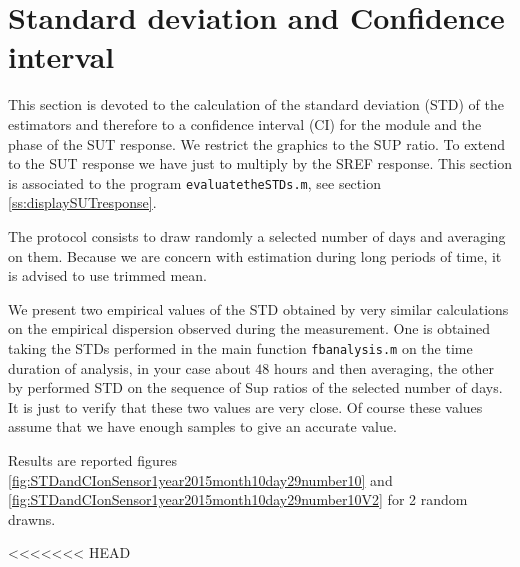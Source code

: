 \newpage\clearpage
\section{Standard deviation and Confidence interval}
This section is devoted to the calculation of the standard deviation (STD) of the estimators and therefore to a confidence interval (CI) for the module and the phase of the SUT response. We restrict the graphics to the SUP ratio. To extend to the SUT response we have just to multiply by the SREF response. This section is associated to the program {\tt evaluatetheSTDs.m}, see section
\ref{ss:displaySUTresponse}.

The protocol consists to draw randomly a selected number of days and averaging on them. Because we are concern with estimation during long periods of time, it is advised to use trimmed mean.

We present  two empirical values of the STD obtained by very similar calculations on the empirical dispersion observed during the measurement. One is obtained taking the STDs performed in the main function {\tt fbanalysis.m} on the time duration of analysis, in your case about $48$ hours and then averaging, the other by performed STD on the sequence of Sup ratios of the selected number of days. It is just to verify that these two values are very close. Of course these values assume that we have enough samples to give an accurate value. 

Results are reported figures \ref{fig:STDandCIonSensor1year2015month10day29number10} and \ref{fig:STDandCIonSensor1year2015month10day29number10V2} for 2 random drawns.


<<<<<<< HEAD

